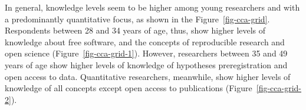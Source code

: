 \documentclass[
  letterpaper,
  DIV=11,
  numbers=noendperiod]{scrartcl}
\begin{document}
In general, knowledge levels seem to be higher among young researchers
and with a predominantly quantitative focus, as shown in the
Figure~\ref{fig-cca-grid}. Respondents between 28 and 34 years of age,
thus, show higher levels of knowledge about free software, and the
concepts of reproducible research and open science
(Figure~\ref{fig-cca-grid-1}). However, researchers between 35 and 49
years of age show higher levels of knowledge of hypotheses
preregistration and open access to data. Quantitative researchers,
meanwhile, show higher levels of knowledge of all concepts except open
access to publications (Figure~\ref{fig-cca-grid-2}).

\begin{figure}

\begin{minipage}[t]{0.50\linewidth}

{\centering 


}

\end{minipage}%
%
\begin{minipage}[t]{0.50\linewidth}


\end{minipage}
\end{figure}
\end{document}
